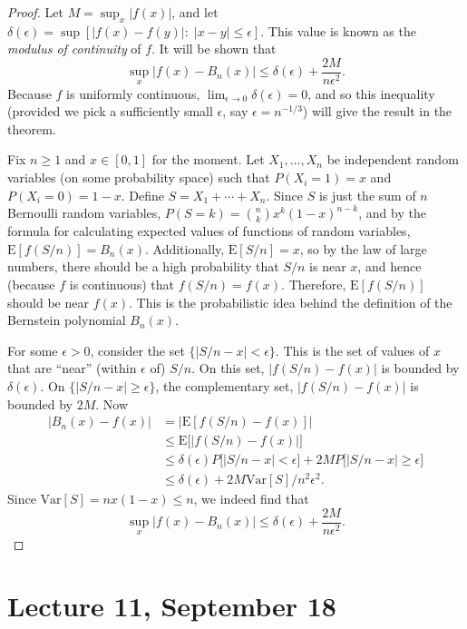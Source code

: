 \documentclass[11pt,fleqn]{book} %
\begin{document}
\begin{proof}
	Let $M = \sup_x |f(x)|$, and let $\delta(\epsilon) = \sup[|f(x)-f(y)|:\;|x-y| \leq \epsilon]$. This value is known as the \emph{modulus of continuity} of $f$. It will be shown that
	\[
		\sup_x |f(x) - B_n(x)| \leq \delta(\epsilon) + \frac{2M}{n\epsilon^2}.
	\]
	Because $f$ is uniformly continuous, $\lim_{\epsilon \to 0} \delta(\epsilon) = 0$, and so this inequality (provided we pick a sufficiently small $\epsilon$, say $\epsilon = n^{-1/3}$) will give the result in the theorem.

	Fix $n \geq 1$ and $x \in [0,1]$ for the moment. Let $X_1,\dots,X_n$ be independent random variables (on some probability space) such that $P(X_i=1) = x$ and $P(X_i=0) = 1-x$. Define $S = X_1 + \cdots + X_n$. Since $S$ is just the sum of $n$ Bernoulli random variables, $P(S=k) = {n \choose k} x^k(1-x)^{n-k}$, and by the formula for calculating expected values of functions of random variables, $\textrm{E}[f(S/n)] = B_n(x)$. Additionally, $\textrm{E}[S/n] = x$, so by the law of large numbers, there should be a high probability that $S/n$ is near $x$, and hence (because $f$ is continuous) that $f(S/n) = f(x)$. Therefore, $\textrm{E}[f(S/n)]$ should be near $f(x)$. This is the probabilistic idea behind the definition of the Bernstein polynomial $B_n(x)$.

	For some $\epsilon > 0$, consider the set $\{|S/n-x| < \epsilon\}$. This is the set of values of $x$ that are ``near'' (within $\epsilon$ of) $S/n$. On this set, $|f(S/n) - f(x)|$ is bounded by $\delta(\epsilon)$. On $\{|S/n-x| \geq \epsilon\}$, the complementary set, $|f(S/n) - f(x)|$ is bounded by $2M$. Now
	\begin{align*}
		|B_n(x) - f(x)| &= \big|\textrm{E}[f(S/n) - f(x)]\big| \\
		&\leq \textrm{E}\big[|f(S/n) - f(x)|\big] \\
		&\leq \delta(\epsilon) P \big[|S/n-x| < \epsilon\big] + 2MP \big[|S/n-x| \geq \epsilon\big] \\
		&\leq \delta(\epsilon) + 2M \textrm{Var}[S]/n^2\epsilon^2. \tag{Chebyshev's Inequality}
	\end{align*}
	Since $\textrm{Var}[S] = nx(1-x) \leq n$, we indeed find that
	\[
		\sup_x |f(x) - B_n(x)| \leq \delta(\epsilon) + \frac{2M}{n\epsilon^2}.
	\]
\end{proof}

\section{Lecture 11, September 18}
\end{document}
